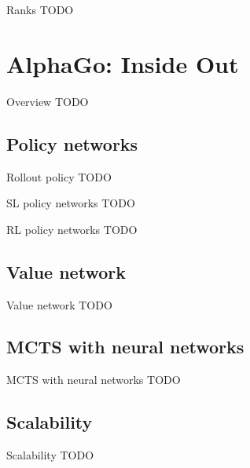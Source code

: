 \documentclass{beamer}
\newcommand{\todo}{\alert{TODO}}
\begin{document}
  \begin{frame}{Ranks}
    \todo
  \end{frame}


  \section{AlphaGo: Inside Out}
  \begin{frame}{Overview}
    \todo
  \end{frame}

  \subsection{Policy networks}
  \begin{frame}{Rollout policy}
    \todo
  \end{frame}

  \begin{frame}{SL policy networks}
    \todo
  \end{frame}

  \begin{frame}{RL policy networks}
    \todo
  \end{frame}

  \subsection{Value network}
  \begin{frame}{Value network}
    \todo
  \end{frame}

  \subsection{MCTS with neural networks}
  \begin{frame}{MCTS with neural networks}
    \todo
  \end{frame}

  \subsection{Scalability}
  \begin{frame}{Scalability}
    \todo
  \end{frame}

\end{document}
